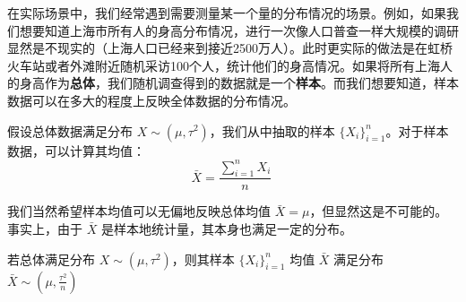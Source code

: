 
在实际场景中，我们经常遇到需要测量某一个量的分布情况的场景。例如，如果我们想要知道上海市所有人的身高分布情况，进行一次像人口普查一样大规模的调研显然是不现实的（上海人口已经来到接近2500万人）。此时更实际的做法是在虹桥火车站或者外滩附近随机采访100个人，统计他们的身高情况。如果将所有上海人的身高作为\textbf{总体}，我们随机调查得到的数据就是一个\textbf{样本}。而我们想要知道，样本数据可以在多大的程度上反映全体数据的分布情况。

假设总体数据满足分布 $X\sim(\mu, \tau^2)$，我们从中抽取的样本 $\{X_i \}_{i=1}^n$。对于样本数据，可以计算其均值：\begin{equation}
\bar X=\frac{\sum_{i=1}^n X_i}{n}~
\end{equation}

我们当然希望样本均值可以无偏地反映总体均值 $\bar X=\mu$，但显然这是不可能的。事实上，由于 $\bar X$ 是样本地统计量，其本身也满足一定的分布。

\begin{theorem}{}
若总体满足分布 $X\sim (\mu, \tau^2)$，则其样本 $\{X_i \}_{i=1}^n$ 均值 $\bar X$ 满足分布 $\bar X\sim (\mu, \frac{\tau^2}{n})$
\end{theorem}

